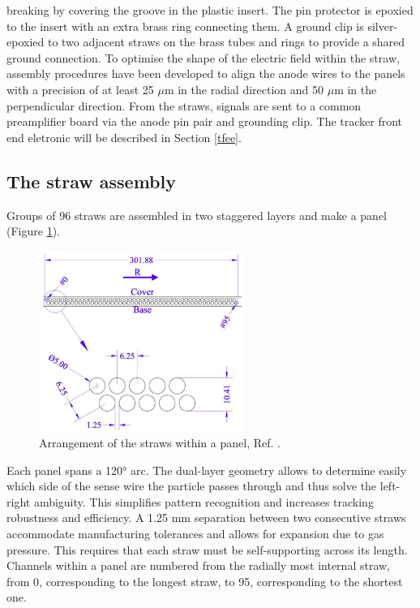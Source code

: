         breaking by covering the groove in the plastic insert. 
        The pin protector is epoxied to the insert with an extra 
        brass ring connecting them. A ground clip is silver-epoxied 
        to two adjacent straws on the brass tubes and rings to 
        provide a shared ground connection.
        To optimise the shape of the electric field within 
        the straw, assembly procedures have been developed 
        to align the anode wires to the panels with a 
        precision of at least 25 $\mu$m in the radial direction and 50 $\mu$m in the perpendicular direction. 
From the straws, signals are sent to a common preamplifier board 
via the anode pin pair and grounding clip. The tracker front 
end eletronic will be described in Section \ref{tfee}.
\subsection{The straw assembly}
Groups of 96 straws are assembled in two staggered layers and make a panel 
(Figure \ref{fig:trktubes}). 
\begin{figure}[!h]
    \centering
    \includegraphics[width =0.6\textwidth]{figures/png/Screenshot_20240326_234405.png}
    \caption{Arrangement of the straws within a panel, Ref. \cite{trk}.}
    \label{fig:trktubes}
    \end{figure}
Each panel spans a 120° arc.
The dual-layer geometry allows to determine easily 
which side of the sense wire the particle passes 
through and thus solve the left-right ambiguity. 
This simplifies pattern recognition and increases 
tracking robustness and efficiency. A 1.25 mm 
separation between two consecutive straws accommodate 
manufacturing tolerances and allows for expansion due 
to gas pressure. This requires that each straw must be 
self-supporting across its length. Channels within a 
panel are numbered from the radially most internal straw, 
from 0, corresponding to the longest straw, to 95, 
corresponding to the shortest one. 
   
